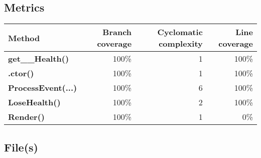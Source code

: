 \documentclass[a4paper,landscape,10pt]{article}
\begin{document}
\subsection{Metrics}
\begin{longtable}[l]{|l|r|r|r|}
\hline
\textbf{Method} & \textbf{Branch coverage} & \textbf{Cyclomatic complexity} & \textbf{Line coverage}\\
\hline
\textbf{get\_\_Health()} & 100\% & 1 & 100\%\\
\hline
\textbf{.ctor()} & 100\% & 1 & 100\%\\
\hline
\textbf{ProcessEvent(...)} & 100\% & 6 & 100\%\\
\hline
\textbf{LoseHealth()} & 100\% & 2 & 100\%\\
\hline
\textbf{Render()} & 100\% & 1 & 0\%\\
\hline
\end{longtable}
\subsection{File(s)}
\end{document}
